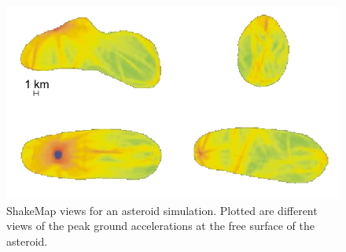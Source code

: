\documentclass[referee,extra]{gji}
\begin{document}
\begin{figure}
\begin{center}
\includegraphics[width=1.\textwidth]{./images/asteroid_shakemap1.jpg}
\end{center}
\caption{ShakeMap views for an asteroid simulation.
Plotted are different views of the peak ground accelerations at the free surface of the asteroid.
}
\label{figure:asteroidshakemap}
\end{figure}
\end{document}
